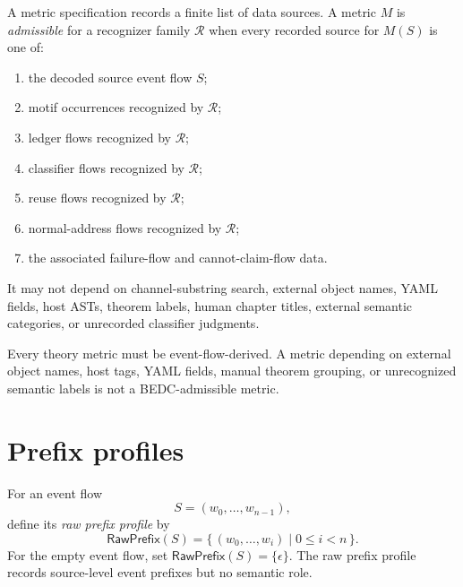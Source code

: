 \begin{definition}
\label{def:metrics-admissibility}
A metric specification records a finite list of data sources. A metric $M$ is \emph{admissible} for a recognizer family $\mathcal R$ when every recorded source for $M(S)$ is one of:
\begin{enumerate}
\item the decoded source event flow $S$;
\item motif occurrences recognized by $\mathcal R$;
\item ledger flows recognized by $\mathcal R$;
\item classifier flows recognized by $\mathcal R$;
\item reuse flows recognized by $\mathcal R$;
\item normal-address flows recognized by $\mathcal R$;
\item the associated failure-flow and cannot-claim-flow data.
\end{enumerate}
It may not depend on channel-substring search, external object names, YAML fields, host ASTs, theorem labels, human chapter titles, external semantic categories, or unrecorded classifier judgments.
\end{definition}

\begin{principle}
\label{prin:metrics-no-external-input}
Every theory metric must be event-flow-derived. A metric depending on external object names, host tags, YAML fields, manual theorem grouping, or unrecognized semantic labels is not a BEDC-admissible metric.
\end{principle}

\section{Prefix profiles}
\label{sec:metrics-prefix-profiles}

\begin{definition}
\label{def:metrics-raw-prefix-profile}
For an event flow
$$
  S=(w_0,\ldots,w_{n-1}),
$$
define its \emph{raw prefix profile} by
$$
  \mathsf{RawPrefix}(S)
  =
  \{\,(w_0,\ldots,w_i)\mid 0\leq i<n\,\}.
$$
For the empty event flow, set $\mathsf{RawPrefix}(S)=\{\epsilon\}$. The raw prefix profile records source-level event prefixes but no semantic role.
\end{definition}

